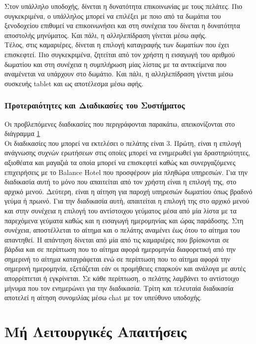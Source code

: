 \noindent
Στον υπάλληλο υποδοχής, δίνεται η δυνατότητα επικοινωνίας με τους πελάτες.
Πιο συγκεκριμένα, ο υπάλληλος μπορεί να επιλέξει με ποιο από τα δωμάτια του ξενοδοχείου επιθυμεί να 
επικοινωνήσει  και στη συνέχεια του δίνεται η δυνατότητα αποστολής μηνύματος. Και πάλι, η 
αλληλεπίδραση γίνεται μέσω αφής. \\

\noindent
Τέλος, στις καμαριέρες, δίνεται η επιλογή  καταγραφής των δωματίων που έχει επισκεφτεί. Πιο
συγκεκριμένα, ζητείται από τον χρήστη η εισαγωγή του αριθμού δωματίου και στη συνέχεια η 
συμπλήρωση  μίας λίστας με τα αντικείμενα που αναμένεται να  υπάρχουν στο δωμάτιο.  Και πάλι, η 
αλληλεπίδραση γίνεται μέσω συσκευής tablet και ως  αποτέλεσμα μέσω αφής.


\subsubsection{Προτεραιότητες και Διαδικασίες του Συστήματος}
Οι προβλεπόμενες διαδικασίες που περιγράφονται παρακάτω, απεικονίζονται στο διάγραμμα \ref{} \\

\noindent
Οι διαδικασίες που μπορεί να εκτελέσει ο πελάτης είναι 3. Πρώτη, είναι η επιλογή ανάγνωσης  συχνών 
ερωτήσεων στις οποίες μπορεί να ενημερωθεί για δραστηριότητες, αξιοθέατα και μαγαζιά τα οποία 
μπορεί να επισκεφτεί καθώς και συνεργαζόμενες επιχειρήσεις με το Balance Hotel που προσφέρουν μία
πληθώρα υπηρεσιών. Για την διαδικασία αυτή το μόνο που απαιτείται από τον χρήστη είναι η επιλογή 
της, στο αρχικό μενού.  Δεύτερη, είναι η αίτηση για παροχή υπηρεσιών δωματίου όπως βραδινό γεύμα ή 
πρωινό. Για την διαδικασία αυτή,  απαιτείται η  επιλογή της στο αρχικό μενού και στην συνέχεια η 
επιλογή του αντίστοιχου γεύματος μέσα από μία λίστα με τα παρεχόμενα γεύματα καθώς και η εισαγωγή 
ημερομηνίας και ώρας παράδοσης.  Στη συνέχεια, αποστέλλεται το αίτημα και ο πελάτης αναμένει έως
ότου το αίτημα του απαντηθεί. Η απάντηση δίνεται από μία από τις καμαριέρες που βρίσκονται σε \\
βάρδια και σε περίπτωση που το αίτημα αφορά ημερομηνία διαφορετική από την σημερινή το αίτημα 
καταγράφεται ενώ σε περίπτωση που το αίτημα αφορά την σημερινή ημερομηνία, εξετάζεται εάν οι 
προμήθειες επαρκούν και ανάλογα με αυτές απορρίπτεται ή εγκρίνεται. Σε κάθε περίπτωση, ο πελάτης 
λαμβάνει το αντίστοιχο μήνυμα που τον ενημερώνει για την διαδικασία. Τρίτη και τελευταία διαδικασία
αποτελεί η αίτηση συνομιλίας μέσω chat με τον υπεύθυνο υποδοχής. 






















\clearpage
\section{Μή Λειτουργικές Απαιτήσεις}

